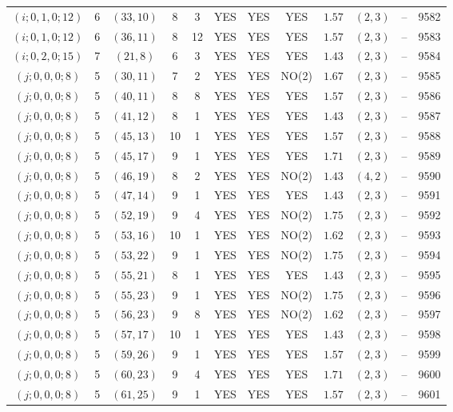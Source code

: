 \begin{longtable}{|c|c|c|c|c|c|c|c|c|c|c|c|}
$(i;0,1,0;12)$ & 6 & $(33,10)$ & 8 & 3 & YES & YES & YES & $1.57$ & $(2,3)$ & -- & 9582\\
$(i;0,1,0;12)$ & 6 & $(36,11)$ & 8 & 12 & YES & YES & YES & $1.57$ & $(2,3)$ & -- & 9583\\
$(i;0,2,0;15)$ & 7 & $(21,8)$ & 6 & 3 & YES & YES & YES & $1.43$ & $(2,3)$ & -- & 9584\\
$(j;0,0,0;8)$ & 5 & $(30,11)$ & 7 & 2 & YES & YES & NO(2) & $1.67$ & $(2,3)$ & -- & 9585\\
$(j;0,0,0;8)$ & 5 & $(40,11)$ & 8 & 8 & YES & YES & YES & $1.57$ & $(2,3)$ & -- & 9586\\
$(j;0,0,0;8)$ & 5 & $(41,12)$ & 8 & 1 & YES & YES & YES & $1.43$ & $(2,3)$ & -- & 9587\\
$(j;0,0,0;8)$ & 5 & $(45,13)$ & 10 & 1 & YES & YES & YES & $1.57$ & $(2,3)$ & -- & 9588\\
$(j;0,0,0;8)$ & 5 & $(45,17)$ & 9 & 1 & YES & YES & YES & $1.71$ & $(2,3)$ & -- & 9589\\
$(j;0,0,0;8)$ & 5 & $(46,19)$ & 8 & 2 & YES & YES & NO(2) & $1.43$ & $(4,2)$ & -- & 9590\\
$(j;0,0,0;8)$ & 5 & $(47,14)$ & 9 & 1 & YES & YES & YES & $1.43$ & $(2,3)$ & -- & 9591\\
$(j;0,0,0;8)$ & 5 & $(52,19)$ & 9 & 4 & YES & YES & NO(2) & $1.75$ & $(2,3)$ & -- & 9592\\
$(j;0,0,0;8)$ & 5 & $(53,16)$ & 10 & 1 & YES & YES & NO(2) & $1.62$ & $(2,3)$ & -- & 9593\\
$(j;0,0,0;8)$ & 5 & $(53,22)$ & 9 & 1 & YES & YES & NO(2) & $1.75$ & $(2,3)$ & -- & 9594\\
$(j;0,0,0;8)$ & 5 & $(55,21)$ & 8 & 1 & YES & YES & YES & $1.43$ & $(2,3)$ & -- & 9595\\
$(j;0,0,0;8)$ & 5 & $(55,23)$ & 9 & 1 & YES & YES & NO(2) & $1.75$ & $(2,3)$ & -- & 9596\\
$(j;0,0,0;8)$ & 5 & $(56,23)$ & 9 & 8 & YES & YES & NO(2) & $1.62$ & $(2,3)$ & -- & 9597\\
$(j;0,0,0;8)$ & 5 & $(57,17)$ & 10 & 1 & YES & YES & YES & $1.43$ & $(2,3)$ & -- & 9598\\
$(j;0,0,0;8)$ & 5 & $(59,26)$ & 9 & 1 & YES & YES & YES & $1.57$ & $(2,3)$ & -- & 9599\\
$(j;0,0,0;8)$ & 5 & $(60,23)$ & 9 & 4 & YES & YES & YES & $1.71$ & $(2,3)$ & -- & 9600\\
$(j;0,0,0;8)$ & 5 & $(61,25)$ & 9 & 1 & YES & YES & YES & $1.57$ & $(2,3)$ & -- & 9601\\

\end{longtable}

